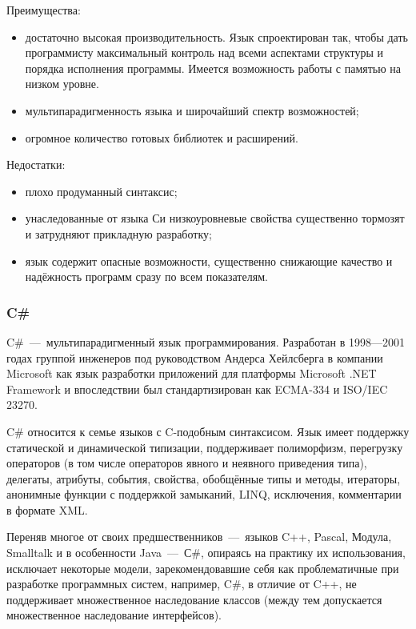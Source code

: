 Преимущества:
\begin{itemize}
	\item достаточно высокая производительность. Язык спроектирован так, чтобы дать программисту максимальный контроль над всеми аспектами структуры и порядка исполнения программы. Имеется возможность работы с памятью на низком уровне.
	\item мультипарадигменность языка и широчайший спектр возможностей;
	\item огромное количество готовых библиотек и расширений.
\end{itemize}

Недостатки:
\begin{itemize}
	\item плохо продуманный синтаксис;
	\item унаследованные от языка Си низкоуровневые свойства существенно тормозят и затрудняют прикладную разработку;
	\item язык содержит опасные возможности, существенно снижающие качество и надёжность программ сразу по всем показателям.~\cite{WikiCpp}
\end{itemize}

\subsubsection{C\#}
C\#~---~мультипарадигменный язык программирования. Разработан в 1998—2001 годах группой инженеров под руководством Андерса Хейлсберга в компании Microsoft как язык разработки приложений для платформы Microsoft .NET Framework и впоследствии был стандартизирован как ECMA-334 и ISO/IEC 23270.

C\# относится к семье языков с C-подобным синтаксисом. Язык имеет поддержку статической и динамической типизации, поддерживает полиморфизм, перегрузку операторов (в том числе операторов явного и неявного приведения типа), делегаты, атрибуты, события, свойства, обобщённые типы и методы, итераторы, анонимные функции с поддержкой замыканий, LINQ, исключения, комментарии в формате XML.

Переняв многое от своих предшественников~---~языков C++, Pascal, Модула, Smalltalk и в особенности Java~---~С\#, опираясь на практику их использования, исключает некоторые модели, зарекомендовавшие себя как проблематичные при разработке программных систем, например, C\#, в отличие от C++, не поддерживает множественное наследование классов (между тем допускается множественное наследование интерфейсов).

